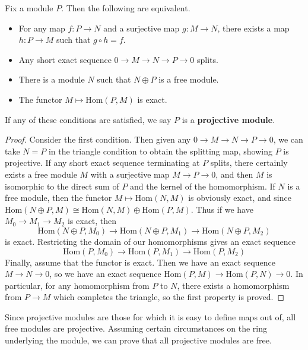 \begin{theorem}
    Fix a module $P$. Then the following are equivalent.
    \begin{itemize}
        \item For any map $f: P \to N$ and a surjective map $g: M \to N$, there exists a map $h: P \to M$ such that $g \circ h = f$.

        \item Any short exact sequence $0 \to M \to N \to P \to 0$ splits.

        \item There is a module $N$ such that $N \oplus P$ is a free module.

        \item The functor $M \mapsto \text{Hom}(P,M)$ is exact.
    \end{itemize}
    If any of these conditions are satisfied, we say $P$ is a {\bf projective module}.
\end{theorem}
\begin{proof}
    Consider the first condition. Then given any $0 \to M \to N \to P \to 0$, we can take $N = P$ in the triangle condition to obtain the splitting map, showing $P$ is projective. If any short exact sequence terminating at $P$ splits, there certainly exists a free module $M$ with a surjective map $M \to P \to 0$, and then $M$ is isomorphic to the direct sum of $P$ and the kernel of the homomorphism. If $N$ is a free module, then the functor $M \mapsto \text{Hom}(N,M)$ is obviously exact, and since $\text{Hom}(N \oplus P, M) \cong \text{Hom}(N,M) \oplus \text{Hom}(P,M)$. Thus if we have $M_0 \to M_1 \to M_2$ is exact, then
    \[ \text{Hom}(N \oplus P, M_0) \to \text{Hom}(N \oplus P, M_1) \to \text{Hom}(N \oplus P, M_2) \]
    is exact. Restricting the domain of our homomorphisms gives an exact sequence
    \[ \text{Hom}(P,M_0) \to \text{Hom}(P,M_1) \to \text{Hom}(P,M_2) \]
    Finally, assume that the functor is exact. Then we have an exact sequence $M \to N \to 0$, so we have an exact sequence $\text{Hom}(P,M) \to \text{Hom}(P,N) \to 0$. In particular, for any homomorphism from $P$ to $N$, there exists a homomorphism from $P \to M$ which completes the triangle, so the first property is proved.
\end{proof}

Since projective modules are those for which it is easy to define maps out of, all free modules are projective. Assuming certain circumstances on the ring underlying the module, we can prove that all projective modules are free.

